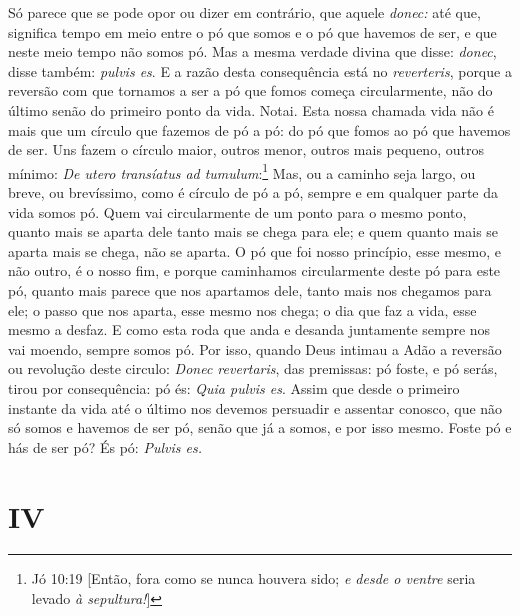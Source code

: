 Só parece que se pode opor ou dizer em contrário, que aquele
\emph{donec:} até que, significa tempo em meio entre o pó que somos e o
pó que havemos de ser, e que neste meio tempo não somos pó. Mas a mesma
verdade divina que disse: \emph{donec}, disse também: \emph{pulvis es}.
E a razão desta consequência está no \emph{reverteris}, porque a
reversão com que tornamos a ser a pó que fomos começa circularmente, não
do último senão do primeiro ponto da vida. Notai. Esta nossa chamada
vida não é mais que um círculo que fazemos de pó a pó: do pó que fomos
ao pó que havemos de ser. Uns fazem o círculo maior, outros menor,
outros mais pequeno, outros mínimo: \emph{De utero transíatus ad
tumulum}:\footnote{Jó 10:19 [Então, fora como se nunca houvera sido; \emph{e desde o ventre} seria levado \emph{à sepultura!}]} Mas, ou a caminho seja largo, ou breve, ou
brevíssimo, como é círculo de pó a pó, sempre e em qualquer parte da
vida somos pó. Quem vai circularmente de um ponto para o mesmo ponto,
quanto mais se aparta dele tanto mais se chega para ele; e quem quanto
mais se aparta mais se chega, não se aparta. O pó que foi nosso
princípio, esse mesmo, e não outro, é o nosso fim, e porque caminhamos
circularmente deste pó para este pó, quanto mais parece que nos
apartamos dele, tanto mais nos chegamos para ele; o passo que nos
aparta, esse mesmo nos chega; o dia que faz a vida, esse mesmo a desfaz.
E como esta roda que anda e desanda juntamente sempre nos vai moendo,
sempre somos pó. Por isso, quando Deus intimau a Adão a reversão ou
revolução deste circulo: \emph{Donec revertaris}, das premissas: pó
foste, e pó serás, tirou por consequência: pó és: \emph{Quia pulvis es}. Assim
que desde o primeiro instante da vida até o último nos devemos persuadir
e assentar conosco, que não só somos e havemos de ser pó, senão que já a
somos, e por isso mesmo. Foste pó e hás de ser pó? És pó: \emph{Pulvis
es.}

\section*{IV}

